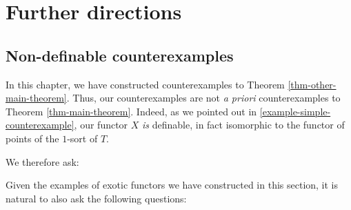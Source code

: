 


\section{Further directions}
\subsection{Non-definable counterexamples}
In this chapter, we have constructed counterexamples to Theorem \ref{thm-other-main-theorem}. Thus, our counterexamples are not \emph{a priori} counterexamples to Theorem \ref{thm-main-theorem}. Indeed, as we pointed out in \ref{example-simple-counterexample}, our functor $X$ \emph{is} definable, in fact isomorphic to the functor of points of the $1$-sort of $T$.

We therefore ask:

  
  Given the examples of exotic functors we have constructed in this section, it is natural to also ask the following questions:




